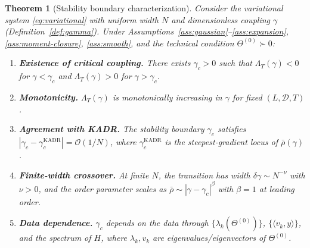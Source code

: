 \documentclass[11pt]{article}
\newtheorem{theorem}{Theorem}[section]
\theoremstyle{definition}
\newcommand{\cD}{\mathcal{D}}
\newcommand{\cO}{\mathcal{O}}
\newcommand{\ip}[2]{\langle #1, #2 \rangle}
\renewcommand{\Theta}{\varTheta}
\begin{document}
\begin{theorem}[Stability boundary characterization]
\label{thm:stability-boundary}
Consider the variational system \eqref{eq:variational} with uniform width $N$ and dimensionless coupling $\gamma$ (Definition~\ref{def:gamma}). Under Assumptions~\ref{ass:gaussian}--\ref{ass:expansion}, \ref{ass:moment-closure}, \ref{ass:smooth}, and the technical condition $\Theta^{(0)} \succ 0$:
\begin{enumerate}[label=(\roman*)]
\item \textbf{Existence of critical coupling.} There exists $\gamma_c > 0$ such that $\Lambda_T(\gamma) < 0$ for $\gamma < \gamma_c$ and $\Lambda_T(\gamma) > 0$ for $\gamma > \gamma_c$.

\item \textbf{Monotonicity.} $\Lambda_T(\gamma)$ is monotonically increasing in $\gamma$ for fixed $(L, \cD, T)$.

\item \textbf{Agreement with KADR.} The stability boundary $\gamma_c$ satisfies $|\gamma_c - \gamma_c^{\mathrm{KADR}}| = \cO(1/N)$, where $\gamma_c^{\mathrm{KADR}}$ is the steepest-gradient locus of $\bar{\rho}(\gamma)$.

\item \textbf{Finite-width crossover.} At finite $N$, the transition has width $\delta\gamma \sim N^{-\nu}$ with $\nu > 0$, and the order parameter scales as $\bar{\rho} \sim |\gamma - \gamma_c|^\beta$ with $\beta = 1$ at leading order.

\item \textbf{Data dependence.} $\gamma_c$ depends on the data through $\{\lambda_k(\Theta^{(0)})\}$, $\{\ip{v_k}{y}\}$, and the spectrum of $H$, where $\lambda_k, v_k$ are eigenvalues/eigenvectors of $\Theta^{(0)}$.
\end{enumerate}
\end{theorem}
\end{document}
